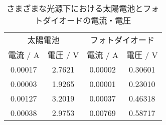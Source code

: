 \begin{table}[!htp]\centering
	\caption{さまざまな光源下における太陽電池とフォトダイオードの電流・電圧}\label{tab:exp1}
	\scriptsize
	\begin{tabular}{cccc}\toprule
		\multicolumn{2}{c}{太陽電池} & \multicolumn{2}{c}{フォトダイオード}                             \\\cmidrule{1-4}
		電流 / \si{A}              & 電圧 / \si{V}                  & 電流 / \si{A} & 電圧 / \si{V} \\\midrule
		0.00017                  & 2.7621                       & 0.00002     & 0.30601     \\
		0.00003                  & 1.9265                       & 0.00001     & 0.23010     \\
		0.00127                  & 3.2019                       & 0.00037     & 0.46318     \\
		0.00038                  & 2.9753                       & 0.00769     & 0.58717     \\
		\bottomrule
	\end{tabular}
\end{table}
